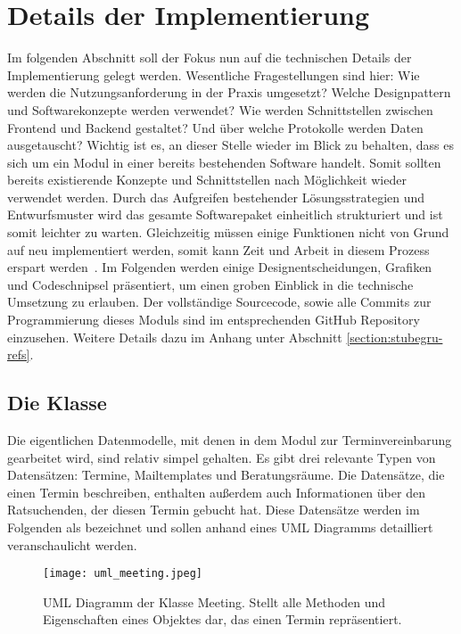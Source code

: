\section{Details der Implementierung}
Im folgenden Abschnitt soll der Fokus nun auf die technischen Details der
Implementierung gelegt werden. Wesentliche Fragestellungen sind hier: Wie
werden die Nutzungsanforderung in der Praxis umgesetzt? Welche Designpattern
und Softwarekonzepte werden verwendet? Wie werden Schnittstellen zwischen
Frontend und Backend gestaltet? Und über welche Protokolle werden Daten
ausgetauscht? Wichtig ist es, an dieser Stelle wieder im Blick zu behalten,
dass es sich um ein Modul in einer bereits bestehenden Software handelt. Somit
sollten bereits existierende Konzepte und Schnittstellen nach Möglichkeit
wieder verwendet werden. Durch das Aufgreifen bestehender Lösungsstrategien und
Entwurfsmuster wird das gesamte Softwarepaket einheitlich strukturiert und ist
somit leichter zu warten. Gleichzeitig müssen einige Funktionen nicht von Grund
auf neu implementiert werden, somit kann Zeit und Arbeit in diesem Prozess
erspart werden~\cite{wiederverwSoftware}. Im Folgenden werden einige
Designentscheidungen, Grafiken und Codeschnipsel präsentiert, um einen groben
Einblick in die technische Umsetzung zu erlauben. Der vollständige Sourcecode,
sowie alle Commits zur Programmierung dieses Moduls sind im entsprechenden
GitHub Repository einzusehen. Weitere Details dazu im Anhang unter Abschnitt
\ref{section:stubegru-refs}.

\subsection*{Die Klasse }
Die eigentlichen Datenmodelle, mit denen in dem Modul zur Terminvereinbarung
gearbeitet wird, sind relativ simpel gehalten. Es gibt drei relevante Typen von
Datensätzen: Termine, Mailtemplates und Beratungsräume. Die Datensätze, die
einen Termin beschreiben, enthalten außerdem auch Informationen über den
Ratsuchenden, der diesen Termin gebucht hat. Diese Datensätze werden im
Folgenden als  bezeichnet und sollen anhand eines \gls{UML}
Diagramms detailliert veranschaulicht werden.

\begin{figure}[H]
    \caption{UML Diagramm der Klasse Meeting. Stellt alle Methoden und Eigenschaften eines Objektes dar, das einen Termin repräsentiert.}
    \centering
    \texttt{[image: uml\_meeting.jpeg]}
\end{figure}

